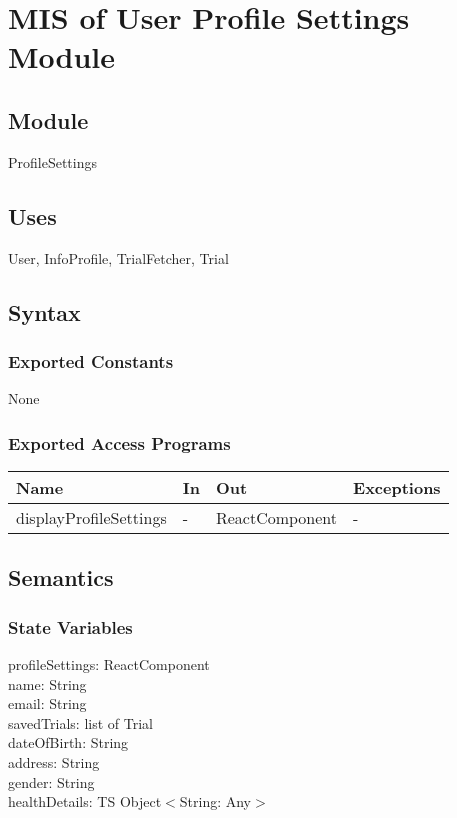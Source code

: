 \documentclass[12pt, titlepage]{article}
\begin{document}
\section{MIS of User Profile Settings Module} \label{ProfileSettings}

\subsection{Module}

ProfileSettings

\subsection{Uses}
User, InfoProfile, TrialFetcher, Trial

\subsection{Syntax}

\subsubsection{Exported Constants}
None

\subsubsection{Exported Access Programs}

\begin{center}
\begin{tabular}{p{4cm} p{4cm} p{4cm} p{4cm}}
\hline
\textbf{Name} & \textbf{In} & \textbf{Out} & \textbf{Exceptions} \\
\hline
displayProfileSettings & - & ReactComponent & - \\
\hline
\end{tabular}
\end{center}

\subsection{Semantics}

\subsubsection{State Variables}

profileSettings: ReactComponent \\
name: String \\
email: String \\
savedTrials: list of Trial \\
dateOfBirth: String \\
address: String \\
gender: String \\
healthDetails: TS Object$<$String: Any$>$
\end{document}
